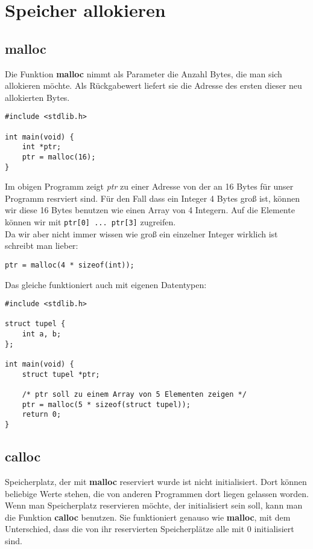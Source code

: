 \documentclass[c_worksheet.tex]{subfiles}
\begin{document}
\section{Speicher allokieren}

\subsection{malloc}
Die Funktion \textbf{malloc} nimmt als Parameter die Anzahl Bytes, die man sich allokieren möchte. Als Rückgabewert liefert sie die Adresse des ersten dieser neu allokierten Bytes.

\begin{lstlisting}
#include <stdlib.h>

int main(void) {
    int *ptr;
    ptr = malloc(16);
}
\end{lstlisting}
Im obigen Programm zeigt \textit{ptr} zu einer Adresse von der an 16 Bytes für unser Programm resrviert sind. Für den Fall dass ein Integer 4 Bytes groß ist, können wir diese 16 Bytes benutzen wie einen Array von 4 Integern. Auf die Elemente können wir mit \lstinline$ptr[0] ... ptr[3]$ zugreifen.\\

Da wir aber nicht immer wissen wie groß ein einzelner Integer wirklich ist schreibt man lieber:
\begin{lstlisting}[numbers=none]
ptr = malloc(4 * sizeof(int));
\end{lstlisting}
Das gleiche funktioniert auch mit eigenen Datentypen:
\begin{lstlisting}
#include <stdlib.h>

struct tupel {
    int a, b;
};

int main(void) {
    struct tupel *ptr;

    /* ptr soll zu einem Array von 5 Elementen zeigen */
    ptr = malloc(5 * sizeof(struct tupel));
    return 0;
}
\end{lstlisting}

\subsection{calloc}

Speicherplatz, der mit \textbf{malloc} reserviert wurde ist nicht initialisiert. Dort können beliebige Werte stehen, die von anderen Programmen dort liegen gelassen worden. Wenn man Speicherplatz reservieren möchte, der initialisiert sein soll, kann man die Funktion \textbf{calloc} benutzen. Sie funktioniert genauso wie \textbf{malloc}, mit dem Unterschied, dass die von ihr reservierten Speicherplätze alle mit 0 initialisiert sind.
\end{document}
